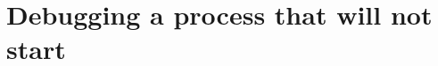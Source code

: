 \chapter{Debugging a process that will not start}
\label{ch:debugging-a-process-that-will-not-start}

